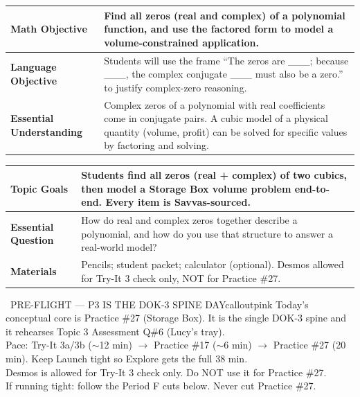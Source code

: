 \documentclass[11pt]{article}
\begin{document}

{\small
\renewcommand{\arraystretch}{1.25}
\noindent\begin{tabular}{|p{1.8in}|p{4.8in}|}
\hline
\textbf{Math Objective} & Find all zeros (real and complex) of a polynomial function, and use the factored form to model a volume-constrained application. \\ \hline
\textbf{Language Objective} & Students will use the frame ``The zeros are \_\_\_; because \_\_\_, the complex conjugate \_\_\_ must also be a zero.'' to justify complex-zero reasoning. \\ \hline
\textbf{Essential Understanding} & Complex zeros of a polynomial with real coefficients come in conjugate pairs. A cubic model of a physical quantity (volume, profit) can be solved for specific values by factoring and solving. \\ \hline
\end{tabular}
}

{\small
\renewcommand{\arraystretch}{1.25}
\noindent\begin{tabular}{|p{1.8in}|p{4.8in}|}
\hline
\textbf{Topic Goals} & Students find all zeros (real + complex) of two cubics, then model a Storage Box volume problem end-to-end. Every item is Savvas-sourced. \\ \hline
\textbf{Essential Question} & How do real and complex zeros together describe a polynomial, and how do you use that structure to answer a real-world model? \\ \hline
\textbf{Materials} & Pencils; student packet; calculator (optional). Desmos allowed for Try-It 3 check only, NOT for Practice \#27. \\ \hline
\end{tabular}
}

\begin{callout}{\IconPin\ PRE-FLIGHT --- P3 IS THE DOK-3 SPINE DAY}{calloutpink}
Today's conceptual core is Practice \#27 (Storage Box). It is the single DOK-3 spine and it rehearses Topic 3 Assessment Q\#6 (Lucy's tray).\\
Pace: Try-It 3a/3b (\(\sim\)12 min) \(\rightarrow\) Practice \#17 (\(\sim\)6 min) \(\rightarrow\) Practice \#27 (20 min). Keep Launch tight so Explore gets the full 38 min.\\
Desmos is allowed for Try-It 3 check only. Do NOT use it for Practice \#27.\\
If running tight: follow the Period F cuts below. Never cut Practice \#27.
\end{callout}
\end{document}
